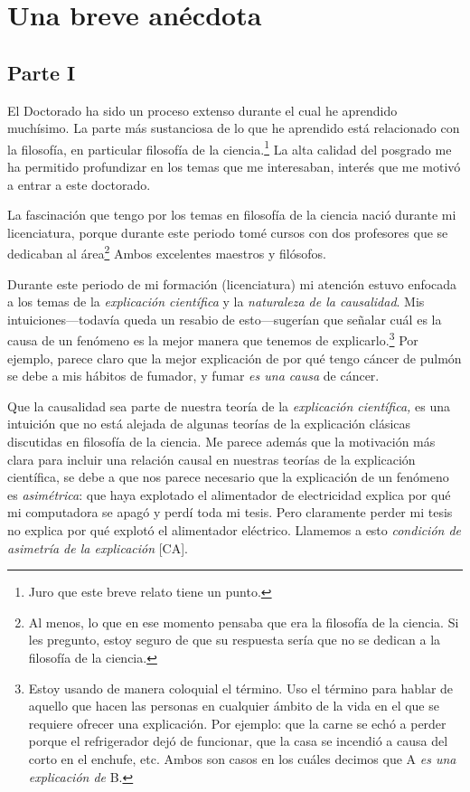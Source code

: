 
\chapter{Una breve anécdota}

\section{Parte I}


\noindent El Doctorado ha sido un proceso extenso
durante el cual he aprendido muchísimo. La parte más
sustanciosa de lo que he aprendido está relacionado
con la filosofía, en particular filosofía de la ciencia.\footnote{
	Juro que este breve relato tiene un punto.
}
La alta calidad del posgrado me ha permitido
profundizar en los temas que me interesaban, interés
que me motivó a entrar a este doctorado.

La fascinación que tengo por los temas en filosofía de
la ciencia nació durante mi licenciatura, porque
durante este periodo tomé cursos con dos profesores
que se dedicaban al área\footnote{
	Al menos, lo que en ese momento pensaba que era la
	filosofía de la	ciencia. Si les pregunto, estoy
	seguro de que su respuesta sería que no se dedican
	a la filosofía de la ciencia.
}
Ambos excelentes maestros y filósofos.

Durante este periodo de mi formación (licenciatura) mi
atención estuvo enfocada a los temas de la \emph{explicación
científica} y la \emph{naturaleza de la causalidad}. Mis
intuiciones---todavía queda un resabio de esto---sugerían
que señalar cuál es la causa de un fenómeno es la mejor
manera que tenemos de
explicarlo.\footnote{
	Estoy usando de manera coloquial el término. Uso el
	término para hablar de aquello que hacen las
	personas en cualquier ámbito de la vida en el que se
	requiere ofrecer una explicación. Por ejemplo: que la
	carne se echó a perder porque el refrigerador
	dejó de funcionar, que la casa se incendió a causa
	del corto en el enchufe, etc. Ambos son casos en los
	cuáles decimos que A \emph{es una explicación de} B.
}
Por ejemplo, parece claro que la mejor explicación de
por qué tengo cáncer de pulmón se debe a mis hábitos
de fumador, y fumar \emph{es una causa} de cáncer.

Que la causalidad sea parte de nuestra teoría de la
\emph{explicación científica,} es una intuición que no
está alejada de algunas teorías de la explicación
clásicas discutidas en filosofía de la ciencia. Me
parece además que la motivación más clara para incluir
una relación causal en nuestras teorías de la
explicación científica, se debe a que nos parece
necesario que la explicación de un fenómeno es \emph{asimétrica}: que haya explotado el alimentador de
electricidad explica por qué mi computadora se apagó
y perdí toda mi tesis. Pero claramente perder mi tesis
no explica por qué explotó el alimentador eléctrico.
Llamemos a esto \emph{condición de asimetría de la
explicación} [CA].

